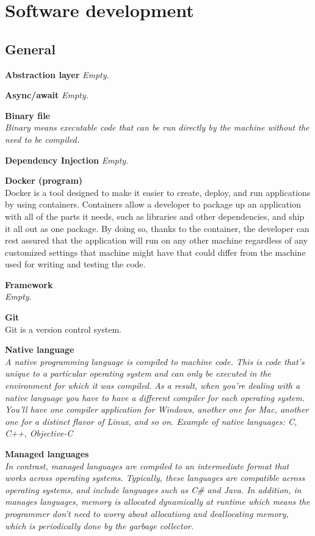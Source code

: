 \section{Software development}
\setcounter{secnumdepth}{3}

\subsection{General}

\textbf{Abstraction layer}
\textit{Empty.}

\textbf{Async/await}
\textit{Empty.}

\textbf{Binary file} \\
\textit{Binary means executable code that can be run directly by the machine without the need to be compiled.}

\textbf{Dependency Injection}
\textit{Empty.}

\textbf{Docker (program) } \\
Docker is a tool designed to make it easier to create, deploy, and run applications by using containers. Containers allow a developer to package up an application with all of the parts it needs, such as libraries and other dependencies, and ship it all out as one package. By doing so, thanks to the container, the developer can rest assured that the application will run on any other machine regardless of any customized settings that machine might have that could differ from the machine used for writing and testing the code.

\textbf{Framework} \\
\textit{Empty.}

\textbf{Git} \\
Git is a version control system. 

\textbf{Native language} \\
\textit{A native programming language is compiled to machine code. This is code that's unique to a particular operating system and can only be executed in the environment for which it was compiled. As a result, when you're dealing with a native language you have to have a different compiler for each operating system. You'll have one compiler application for Windows, another one for Mac, another one for a distinct flavor of Linux, and so on. Example of native languages: C, C++, Objective-C }

\textbf{Managed languages} \\
\textit{In contrast, managed languages are compiled to an intermediate format that works across operating systems. Typically, these languages are compatible across operating systems, and include languages such as C\# and Java. In addition, in manages languages, memory is allocated dynamically at runtime which means the programmer don't need to worry about allocationg and deallocating memory, which is periodically done by the garbage collector. }

